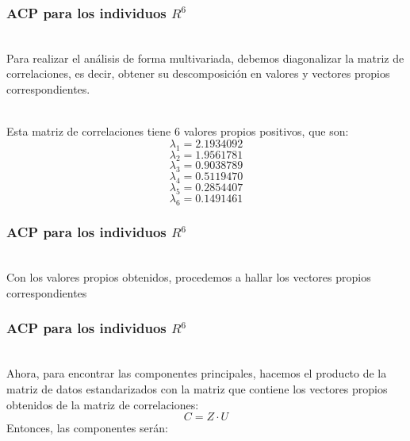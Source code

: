 \documentclass[12pt]{beamer}
\begin{document}
\begin{frame}
\frametitle{ACP para los individuos $R^6$}
~\\Para realizar el análisis de forma multivariada, debemos diagonalizar la matriz de correlaciones, es decir, obtener su descomposición en valores y  vectores propios correspondientes.

~\\Esta matriz de correlaciones tiene 6 valores propios positivos, que son:
$$\lambda_1=2.1934092$$
$$\lambda_2=1.9561781$$
$$\lambda_3=0.9038789$$
$$\lambda_4=0.5119470$$
$$\lambda_5=0.2854407$$
$$\lambda_6=0.1491461$$
\end{frame}

\begin{frame}
\frametitle{ACP para los individuos $R^6$}
~\\Con los valores propios obtenidos, procedemos a hallar los vectores propios correspondientes

\begin{center}
\end{center}
\end{frame}

\begin{frame}
\frametitle{ACP para los individuos $R^6$}
~\\Ahora, para encontrar las componentes principales, hacemos el producto de la matriz de datos estandarizados con la matriz que contiene los vectores propios obtenidos de la matriz de correlaciones:
$$C=Z\cdot U$$
Entonces, las componentes serán:
\end{frame}
\end{document}
